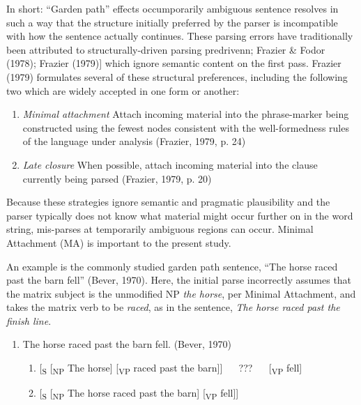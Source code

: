 \documentclass[12pt,oneside]{book}
\providecommand{\tightlist}{%
  \setlength{\itemsep}{0pt}\setlength{\parskip}{0pt}}
\begin{document}
In short: ``Garden path'' effects occumporarily ambiguous sentence resolves in such a way that the structure initially preferred by the parser is incompatible with how the sentence actually continues. These parsing errors have traditionally been attributed to structurally-driven parsing predrivenn; Frazier \& Fodor (1978); Frazier (1979){]} which ignore semantic content on the first pass. Frazier (1979) formulates several of these structural preferences, including the following two which are widely accepted in one form or another:

\begin{enumerate}
\def\labelenumi{(\arabic{enumi})}
\item
  \emph{Minimal attachment} \linebreak\nopagebreak
  Attach incoming material into the phrase-marker being constructed using the fewest nodes consistent with the well-formedness rules of the language under analysis (Frazier, 1979, p. 24)
\item
  \emph{Late closure} \linebreak\nopagebreak
  When possible, attach incoming material into the clause currently being parsed (Frazier, 1979, p. 20)
\end{enumerate}

Because these strategies ignore semantic and pragmatic plausibility and the parser typically does not know what material might occur further on in the word string, mis-parses at temporarily ambiguous regions can occur. Minimal Attachment (MA) is important to the present study.

An example is the commonly studied garden path sentence, ``The horse raced past the barn fell'' (Bever, 1970). Here, the initial parse incorrectly assumes that the matrix subject is the unmodified NP \emph{the horse}, per Minimal Attachment, and takes the matrix verb to be \emph{raced}, as in the sentence, \emph{The horse raced past the finish line}.

\begin{enumerate}
\def\labelenumi{(\arabic{enumi})}
\setcounter{enumi}{2}
\tightlist
\item
  The horse raced past the barn fell. (Bever, 1970)

  \begin{enumerate}
  \def\labelenumii{\alph{enumii})}
  \tightlist
  \item
    {[}\textsubscript{S} {[}\textsubscript{NP} The horse{]} {[}\textsubscript{VP} raced past the barn{]}{]}   ???   {[}\textsubscript{VP} fell{]}
  \item
    {[}\textsubscript{S} {[}\textsubscript{NP} The horse raced past the barn{]} {[}\textsubscript{VP} fell{]}{]}
  \end{enumerate}
\end{enumerate}
\end{document}

